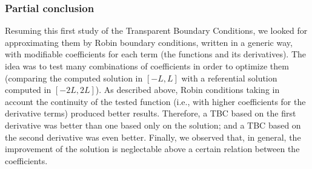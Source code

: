 \subsubsection{Partial conclusion} 

\indent Resuming this first study of the Transparent Boundary Conditions, we looked for approximating them by Robin boundary conditions, written in a generic way, with modifiable coefficients for each term (the functions and its derivatives). The idea was to test many combinations of coefficients in order to optimize them (comparing the computed solution in $[-L,L]$ with a referential solution computed in $[-2L,2L]$). As described above, Robin conditions taking in account the continuity of the tested function (i.e., with higher coefficients for the derivative terms) produced better results. Therefore, a TBC based on the first derivative was better than one based only on the solution; and a TBC based on the second derivative was even better. Finally, we observed that, in general, the improvement of the solution is neglectable above a certain relation between the coefficients. 